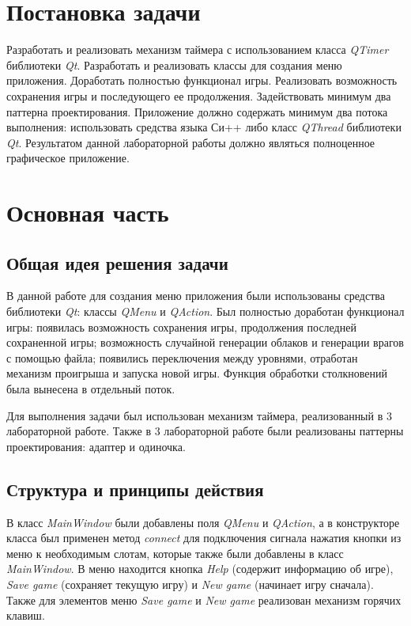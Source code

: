 \documentclass[a4paper,14pt]{article}
\begin{document}

\setcounter{page}{2} %

\renewcommand\contentsname{\centering {\normalsize Содержание}}
\tableofcontents
\newpage

\section*{Постановка задачи}

Разработать и реализовать механизм таймера с использованием класса \textit{QTimer} библиотеки \textit{Qt}. Разработать и реализовать классы для создания меню приложения. Доработать полностью функционал игры. Реализовать возможность сохранения игры и последующего ее продолжения. Задействовать минимум два паттерна проектирования. Приложение должно содержать минимум два потока выполнения: использовать средства языка Си++ либо класс \textit{QThread} библиотеки \textit{Qt}. Результатом данной лабораторной работы должно являться полноценное графическое приложение.



\newpage

\section{Основная часть}
\subsection{Общая идея решения задачи}
В данной работе для создания меню приложения были использованы средства библиотеки \textit{Qt}: классы \textit{QMenu} и \textit{QAction}. Был полностью доработан функционал игры: появилась возможность сохранения игры, продолжения последней сохраненной игры; возможность случайной генерации облаков и генерации врагов с помощью файла; появились переключения между уровнями, отработан механизм проигрыша и запуска новой игры. Функция обработки столкновений была вынесена в отдельный поток.

Для выполнения задачи был использован механизм таймера, реализованный в 3 лабораторной работе. Также в 3 лабораторной работе были реализованы паттерны проектирования: адаптер и одиночка.

\subsection{Структура и принципы действия}
В класс \textit{MainWindow} были добавлены поля \textit{QMenu} и \textit{QAction}, а в конструкторе класса был применен метод \textit{connect} для подключения сигнала нажатия кнопки из меню к необходимым слотам, которые также были добавлены в класс \textit{MainWindow}. В меню находится кнопка \textit{Help} (содержит информацию об игре), \textit{Save game} (сохраняет текущую игру) и \textit{New game} (начинает игру сначала). Также для элементов меню \textit{Save game} и \textit{New game} реализован механизм горячих клавиш. 
\end{document}
